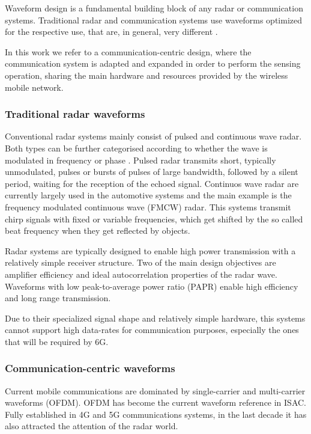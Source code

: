 	Waveform design is a fundamental building block of any radar or communication systems. Traditional radar and communication systems use waveforms optimized for the respective use, that are, in general, very different \cite{Zhang_Rahman_Wu_Huang_Guo_Chen_Yuan_2022}.
	
	In this work we refer to a communication-centric design, where the communication system is adapted and expanded in order to perform the sensing operation, sharing the main hardware and resources provided by the wireless mobile network.
	 
	
	\subsubsection{Traditional radar waveforms}
	
	Conventional radar systems mainly consist of pulsed and continuous wave radar. Both types can be further categorised according to whether the wave is modulated in frequency or phase \cite{Friedlander_2007}.
	Pulsed radar transmits short, typically unmodulated, pulses or bursts of pulses of large bandwidth, followed by a silent period, waiting for the reception of the echoed signal. Continuos wave radar are currently largely used in the automotive systems and the main example is the frequency modulated continuous wave (FMCW) radar. This systems transmit chirp signals with fixed or variable frequencies, which get shifted by the so called beat frequency when they get reflected by objects.
	
	Radar systems are typically designed to enable high power transmission with a relatively simple receiver structure. Two of the main design objectives are amplifier efficiency and ideal autocorrelation properties of the radar wave. Waveforms with low peak-to-average power ratio (PAPR) enable high efficiency and long range transmission.
	
	Due to their specialized signal shape and relatively simple hardware, this systems cannot support high data-rates for communication purposes, especially the ones that will be required by 6G.
	
	\subsubsection{Communication-centric waveforms}
	
	Current mobile communications are dominated by single-carrier and multi-carrier waveforms (OFDM).
	OFDM has become the current waveform reference in ISAC. Fully established in 4G and 5G communications systems, in the last decade it has also attracted the attention of the radar world.
	
